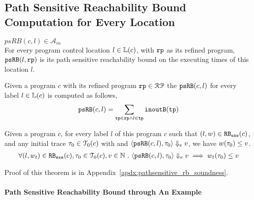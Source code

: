 \subsection{Path Sensitive Reachability Bound Computation for Every Location}
\label{sec:pathsensitive_rb-psrbcompute}
$psRB(c, l) \in \mathcal{A}_{in}$
\\
For every program control location $l \in \mathbb{L}(c)$, with $\mathtt{rp}$ as its refined program,
 $\mathtt{psRB}(l, \mathtt{rp})$ is its path sensitive reachability bound on the executing times of this location $l$.
 \\
 \begin{defn}
  \label{def:label_psrb}
Given a program $c$ with its refined program $\mathtt{rp} \in \mathcal{RP}$
the $\mathtt{psRB}(c, l)$ for every label $l \in \mathbb{L}(c)$ is computed as follows,
\\
\[ \mathtt{psRB}(c, l) = \sum\limits_{\mathtt{tp} \in \mathtt{rp} \land 
l \in \mathtt{tp}} \mathtt{inoutB}(\mathtt{tp})\]
 \end{defn}
\begin{thm}
  \label{thm:pathsensitive_rb_soundness}
Given a program ${c}$, for every label $l$ of this program $c$ such that $(l, w) \in \mathtt{RB_{exe}}(c)$, 
and any initial trace $\mathtt{\tau}_0 \in \mathcal{T}_0(c)$ with 
and $\langle \mathtt{psRB}(c, l), \mathtt{\tau}_0 \rangle \Downarrow_e v$,
we have $ w(\mathtt{\tau}_0) \leq v $.
%
\[
  \begin{array}{l}
  \forall (l, w_{t}) \in \mathtt{RB_{exe}}(c),
  \mathtt{\tau}_0 \in \mathcal{T}_0(c), 
  v \in \mathbb{N} ~.~
  \langle \mathtt{psRB}(c, l), \mathtt{\tau}_0 \rangle \Downarrow_e v
  \implies
  w_{t}(\mathtt{\tau}_0) \leq v
  \end{array}
\]
\end{thm}
%
Proof of this theorem is in Appendix~\ref{apdx:pathsensitive_rb_soundness}.
\paragraph*{Path Sensitive Reachability Bound through An Example}
